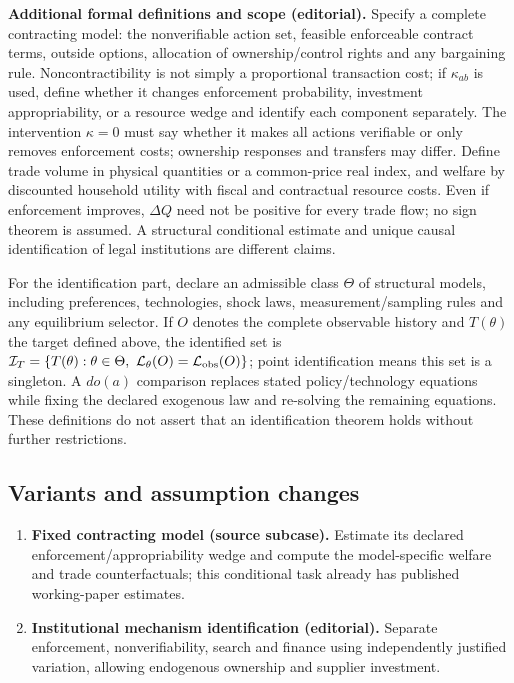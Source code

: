 \documentclass[11pt,a4paper]{article}
\begin{document}
\textbf{Additional formal definitions and scope (editorial).} Specify a complete contracting model: the nonverifiable action set, feasible enforceable contract terms, outside options, allocation of ownership/control rights and any bargaining rule. Noncontractibility is not simply a proportional transaction cost; if \(\kappa_{ab}\) is used, define whether it changes enforcement probability, investment appropriability, or a resource wedge and identify each component separately. The intervention \(\kappa=0\) must say whether it makes all actions verifiable or only removes enforcement costs; ownership responses and transfers may differ. Define trade volume in physical quantities or a common-price real index, and welfare by discounted household utility with fiscal and contractual resource costs. Even if enforcement improves, \(\Delta Q\) need not be positive for every trade flow; no sign theorem is assumed. A structural conditional estimate and unique causal identification of legal institutions are different claims.

For the identification part, declare an admissible class \(\Theta\) of structural models, including preferences, technologies, shock laws, measurement/sampling rules and any equilibrium selector. If \(O\) denotes the complete observable history and \(T(\theta)\) the target defined above, the identified set is \(\mathcal I_T=\{T(\theta):\theta\in\Theta,\ \mathcal L_\theta(O)=\mathcal L_{\rm obs}(O)\}\); point identification means this set is a singleton. A \(do(a)\) comparison replaces stated policy/technology equations while fixing the declared exogenous law and re-solving the remaining equations. These definitions do not assert that an identification theorem holds without further restrictions.
\subsection*{Variants and assumption changes}
\begin{enumerate}
\item \textbf{Fixed contracting model (source subcase).} Estimate its declared enforcement/appropriability wedge and compute the model-specific welfare and trade counterfactuals; this conditional task already has published working-paper estimates.
\item \textbf{Institutional mechanism identification (editorial).} Separate enforcement, nonverifiability, search and finance using independently justified variation, allowing endogenous ownership and supplier investment.
\end{enumerate}
\end{document}
